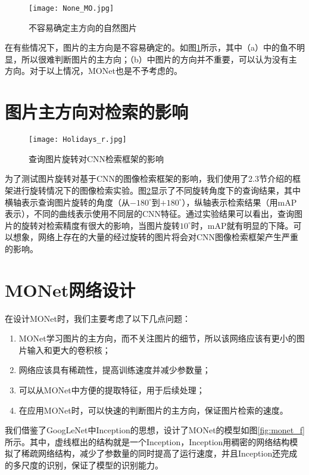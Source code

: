 \begin{figure}
	\centering
	\texttt{[image: None\_MO.jpg]}
	\caption{不容易确定主方向的自然图片}\label{fig:n_mo}
\end{figure}

在有些情况下，图片的主方向是不容易确定的。如图\ref{fig:n_mo}所示，其中（a）中的鱼不明显，所以很难判断图片的主方向；（b）中图片的方向并不重要，可以认为没有主方向。对于以上情况，MONet也是不予考虑的。

\section{图片主方向对检索的影响}
\begin{figure}
	\centering
	\texttt{[image: Holidays\_r.jpg]}
	\caption{查询图片旋转对CNN检索框架的影响}\label{fig:hr}
\end{figure}
为了测试图片旋转对基于CNN的图像检索框架的影响，我们使用了2.3节介绍的框架进行旋转情况下的图像检索实验。图\ref{fig:hr}显示了不同旋转角度下的查询结果，其中横轴表示查询图片旋转的角度（从$-180^{\circ}$到$+180^{\circ}$），纵轴表示检索结果（用mAP表示），不同的曲线表示使用不同层的CNN特征。通过实验结果可以看出，查询图片的旋转对检索精度有很大的影响，当图片旋转$10^{\circ}$时，mAP就有明显的下降。可以想象，网络上存在的大量的经过旋转的图片将会对CNN图像检索框架产生严重的影响。

\section{MONet网络设计}
在设计MONet时，我们主要考虑了以下几点问题：
\begin{enumerate}
	\item MONet学习图片的主方向，而不关注图片的细节，所以该网络应该有更小的图片输入和更大的卷积核；
	\item 网络应该具有稀疏性，提高训练速度并减少参数量；
	\item 可以从MONet中方便的提取特征，用于后续处理；
	\item 在应用MONet时，可以快速的判断图片的主方向，保证图片检索的速度。
\end{enumerate}

我们借鉴了GoogLeNet中Inception\cite{szegedy2015going}的思想，设计了MONet的模型如图\ref{fig:monet_f}所示。其中，虚线框出的结构就是一个Inception\cite{szegedy2015going}，Inception用稠密的网络结构模拟了稀疏网络结构，减少了参数量的同时提高了运行速度，并且Inception还完成的多尺度的识别，保证了模型的识别能力。

